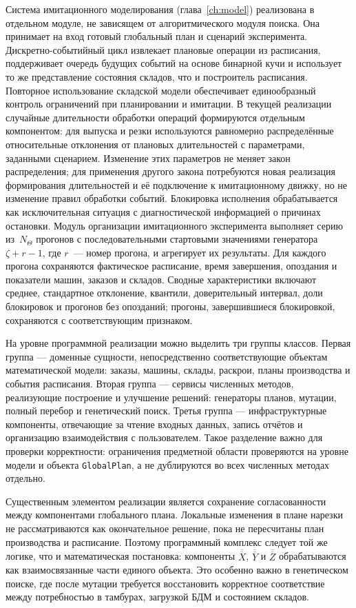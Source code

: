 Система имитационного моделирования (глава~\ref{ch:model}) реализована в отдельном модуле, не зависящем от алгоритмического модуля поиска. Она принимает на вход готовый глобальный план и сценарий эксперимента. Дискретно-событийный цикл извлекает плановые операции из расписания, поддерживает очередь будущих событий на основе бинарной кучи и использует то же представление состояния складов, что и построитель расписания. Повторное использование складской модели обеспечивает единообразный контроль ограничений при планировании и имитации.
В текущей реализации случайные длительности обработки операций формируются отдельным компонентом: для выпуска и резки используются равномерно распределённые относительные отклонения от плановых длительностей с параметрами, заданными сценарием. Изменение этих параметров не меняет закон распределения; для применения другого закона потребуются новая реализация формирования длительностей и её подключение к имитационному движку, но не изменение правил обработки событий. Блокировка исполнения обрабатывается как исключительная ситуация с диагностической информацией о причинах остановки. Модуль организации имитационного эксперимента выполняет серию из~$N_{\Theta}$ прогонов с последовательными стартовыми значениями генератора $\zeta+r-1$, где $r$~--- номер прогона, и агрегирует их результаты. Для каждого прогона сохраняются фактическое расписание, время завершения, опоздания и показатели машин, заказов и складов. Сводные характеристики включают среднее, стандартное отклонение, квантили, доверительный интервал, доли блокировок и прогонов без опозданий; прогоны, завершившиеся блокировкой, сохраняются с соответствующим признаком.

На уровне программной реализации можно выделить три группы классов. Первая группа --- доменные сущности, непосредственно соответствующие объектам математической модели: заказы, машины, склады, раскрои, планы производства и события расписания. Вторая группа --- сервисы численных методов, реализующие построение и улучшение решений: генераторы планов, мутации, полный перебор и генетический поиск. Третья группа --- инфраструктурные компоненты, отвечающие за чтение входных данных, запись отчётов и организацию взаимодействия с пользователем. Такое разделение важно для проверки корректности: ограничения предметной области проверяются на уровне модели и объекта \texttt{GlobalPlan}, а не дублируются во всех численных методах отдельно.

Существенным элементом реализации является сохранение согласованности между компонентами глобального плана. Локальные изменения в плане нарезки не рассматриваются как окончательное решение, пока не пересчитаны план производства и расписание. Поэтому программный комплекс следует той же логике, что и математическая постановка: компоненты $\overline{\overline{X}}$, $\overline{\overline{Y}}$ и $\overline{\overline{Z}}$ обрабатываются как взаимосвязанные части единого объекта. Это особенно важно в генетическом поиске, где после мутации требуется восстановить корректное соответствие между потребностью в тамбурах, загрузкой БДМ и состоянием складов.

